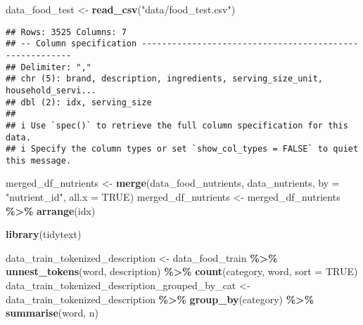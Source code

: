 \documentclass[
]{article}
\newenvironment{Shaded}{\begin{snugshade}}{\end{snugshade}}
\newcommand{\AttributeTok}[1]{\textcolor[rgb]{0.13,0.29,0.53}{#1}}
\newcommand{\ConstantTok}[1]{\textcolor[rgb]{0.56,0.35,0.01}{#1}}
\newcommand{\FunctionTok}[1]{\textcolor[rgb]{0.13,0.29,0.53}{\textbf{#1}}}
\newcommand{\NormalTok}[1]{#1}
\newcommand{\OtherTok}[1]{\textcolor[rgb]{0.56,0.35,0.01}{#1}}
\newcommand{\SpecialCharTok}[1]{\textcolor[rgb]{0.81,0.36,0.00}{\textbf{#1}}}
\newcommand{\StringTok}[1]{\textcolor[rgb]{0.31,0.60,0.02}{#1}}
\begin{document}
\begin{Shaded}
\begin{Highlighting}[]
\NormalTok{data\_food\_test }\OtherTok{\textless{}{-}} \FunctionTok{read\_csv}\NormalTok{(}\StringTok{"data/food\_test.csv"}\NormalTok{)}
\end{Highlighting}
\end{Shaded}

\begin{verbatim}
## Rows: 3525 Columns: 7
## -- Column specification --------------------------------------------------------
## Delimiter: ","
## chr (5): brand, description, ingredients, serving_size_unit, household_servi...
## dbl (2): idx, serving_size
## 
## i Use `spec()` to retrieve the full column specification for this data.
## i Specify the column types or set `show_col_types = FALSE` to quiet this message.
\end{verbatim}

\begin{Shaded}
\begin{Highlighting}[]
\NormalTok{merged\_df\_nutrients }\OtherTok{\textless{}{-}} \FunctionTok{merge}\NormalTok{(data\_food\_nutrients, data\_nutrients, }\AttributeTok{by =} \StringTok{"nutrient\_id"}\NormalTok{, }\AttributeTok{all.x =} \ConstantTok{TRUE}\NormalTok{)}
\NormalTok{merged\_df\_nutrients }\OtherTok{\textless{}{-}}\NormalTok{ merged\_df\_nutrients }\SpecialCharTok{\%\textgreater{}\%} \FunctionTok{arrange}\NormalTok{(idx)}
\end{Highlighting}
\end{Shaded}

\begin{Shaded}
\begin{Highlighting}[]
\FunctionTok{library}\NormalTok{(tidytext)}
\end{Highlighting}
\end{Shaded}

\begin{Shaded}
\begin{Highlighting}[]
\NormalTok{data\_train\_tokenized\_description }\OtherTok{\textless{}{-}}\NormalTok{ data\_food\_train }\SpecialCharTok{\%\textgreater{}\%} \FunctionTok{unnest\_tokens}\NormalTok{(word, description) }\SpecialCharTok{\%\textgreater{}\%} \FunctionTok{count}\NormalTok{(category, word, }\AttributeTok{sort =} \ConstantTok{TRUE}\NormalTok{)}
\NormalTok{data\_train\_tokenized\_description\_grouped\_by\_cat }\OtherTok{\textless{}{-}}\NormalTok{ data\_train\_tokenized\_description }\SpecialCharTok{\%\textgreater{}\%} \FunctionTok{group\_by}\NormalTok{(category) }\SpecialCharTok{\%\textgreater{}\%} \FunctionTok{summarise}\NormalTok{(word, n)}
\end{Highlighting}
\end{Shaded}
\end{document}
